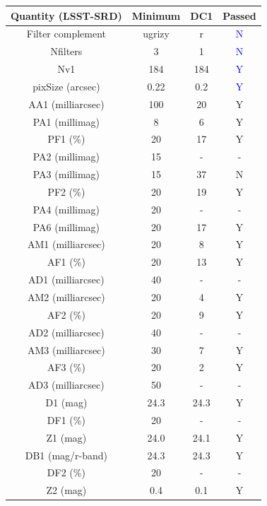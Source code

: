\documentclass[twocolumn]{aastex62}
\begin{document}
\begin{table}[h!]
\centering
\begin{tabular}{|c|c|c|c|}
\hline
Quantity (LSST-SRD) & Minimum & DC1 & Passed\\
\hline
Filter complement & ugrizy & r & \textcolor{blue}{N}\\
Nfilters & 3 & 1 & \textcolor{blue}{N}\\
Nv1 & 184 & 184 & \textcolor{blue}{Y}\\
pixSize (arcsec) & 0.22 & 0.2 & \textcolor{blue}{Y}\\
AA1 (milliarcsec) & 100 & 20 & Y\\
PA1 (millimag) & 8 & 6 & Y\\
PF1 (\%) & 20 & 17 & Y\\
PA2 (millimag) & 15 & - & -\\
PA3 (millimag) & 15 & 37  & N\\
PF2 (\%) & 20 & 19 & Y\\
PA4 (millimag) & 20 & - & -\\
PA6 (millimag) & 20 & 17 & Y\\
AM1 (milliarcsec) & 20 & 8 & Y\\
AF1 (\%) & 20 & 13 & Y\\
AD1 (milliarcsec) & 40 & - & -\\
AM2 (milliarcsec) & 20 & 4 & Y\\
AF2 (\%) & 20 & 9 & Y\\
AD2 (milliarcsec) & 40 & - & -\\
AM3 (milliarcsec) & 30 & 7 & Y\\
AF3 (\%) & 20 & 2 & Y\\
AD3 (milliarcsec) & 50 & - & -\\
D1 (mag) & 24.3 & 24.3 & Y\\
DF1 (\%) & 20 & - & -\\
Z1 (mag) & 24.0 & 24.1 & Y\\
DB1 (mag/r-band) & 24.3 & 24.3 & Y\\
DF2 (\%) & 20 & - & -\\
Z2 (mag) & 0.4 & 0.1 & Y\\

\end{tabular}
\end{table}
\end{document}
